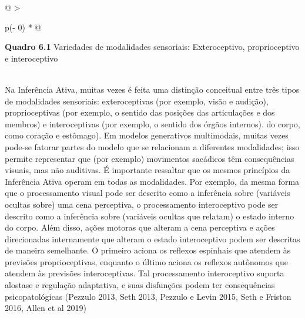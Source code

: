 \documentclass[
  12pt,
]{book}
\begin{document}
\begin{longtable}[]{@{}
  >{\raggedright\arraybackslash}p{(\columnwidth - 0\tabcolsep) * }@{}}
\toprule
\begin{minipage}[b]{\linewidth}\raggedright
\textbf{Quadro 6.1} Variedades de modalidades sensoriais: Exteroceptivo, proprioceptivo e interoceptivo
\end{minipage} \\
\midrule
\endhead
Na Inferência Ativa, muitas vezes é feita uma distinção conceitual entre três tipos de modalidades sensoriais: exteroceptivas (por exemplo, visão e audição), proprioceptivas (por exemplo, o sentido das posições das articulações e dos membros) e interoceptivas (por exemplo, o sentido dos órgãos internos). do corpo, como coração e estômago). Em modelos generativos multimodais, muitas vezes pode-se fatorar partes do modelo que se relacionam a diferentes modalidades; isso permite representar que (por exemplo) movimentos sacádicos têm consequências visuais, mas não auditivas. É importante ressaltar que os mesmos princípios da Inferência Ativa operam em todas as modalidades. Por exemplo, da mesma forma que o processamento visual pode ser descrito como a inferência sobre (variáveis \hspace{0pt}\hspace{0pt}ocultas sobre) uma cena perceptiva, o processamento interoceptivo pode ser descrito como a inferência sobre (variáveis \hspace{0pt}\hspace{0pt}ocultas que relatam) o estado interno do corpo. Além disso, ações motoras que alteram a cena perceptiva e ações direcionadas internamente que alteram o estado interoceptivo podem ser descritas de maneira semelhante. O primeiro aciona os reflexos espinhais que atendem às previsões proprioceptivas, enquanto o último aciona os reflexos autônomos que atendem às previsões interoceptivas. Tal processamento interoceptivo suporta alostase e regulação adaptativa, e suas disfunções podem ter consequências psicopatológicas (Pezzulo 2013, Seth 2013, Pezzulo e Levin 2015, Seth e Friston 2016, Allen et al 2019) \\
\bottomrule
\end{longtable}
\end{document}
